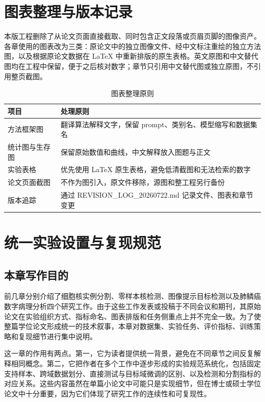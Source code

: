 \section{图表整理与版本记录}
本版工程删除了从论文页面直接截取、同时包含正文段落或页眉页脚的图像资产。各章使用的图表改为三类：原论文中的独立图像文件、经中文标注重绘的独立方法图，以及根据原论文数据在 LaTeX 中重新排版的原生表格。英文原图和中文替代图均在工程中保留，便于之后核对数字；章节只引用中文替代图或独立原图，不引用整页截图。

\begin{table}[htbp]
  \centering
  \caption{图表整理原则}
  \label{tab:appendix_revision_rules}
  \small
  \begin{tabular}{ll}
    \toprule
    项目 & 处理原则 \\
    \midrule
    方法框架图 & 翻译算法解释文字，保留 prompt、类别名、模型缩写和数据集名 \\
    统计图与生存图 & 保留原始数值和曲线，中文解释放入图题与正文 \\
    实验表格 & 优先使用 LaTeX 原生表格，避免低清截图和无法检索的数字 \\
    论文页面截图 & 不作为图引入，原文件移除，源图和整工程另行备份 \\
    版本追踪 & 通过 REVISION\_LOG\_20260722.md 记录文件、图表和章节变更 \\
    \bottomrule
  \end{tabular}
\end{table}

\section{统一实验设置与复现规范}

\subsection{本章写作目的}
前几章分别介绍了细胞核实例分割、零样本核检测、图像提示目标检测以及肺鳞癌数字病理分析四个研究工作。由于这些工作发表或投稿于不同会议和期刊，其原始论文在实验组织方式、指标命名、图表排版和任务侧重点上并不完全一致。为了使整篇学位论文形成统一的技术叙事，本章对数据集、实验任务、评价指标、训练策略和复现细节进行集中说明。

这一章的作用有两点。第一，它为读者提供统一背景，避免在不同章节之间反复解释相同概念。第二，它把作者在多个工作中逐步形成的实验规范系统化，包括固定支持样本、跨域数据划分、直接测试与目标域微调的区别、以及检测和分割指标的对应关系。这些内容虽然在单篇小论文中可能只是实现细节，但在博士或硕士学位论文中十分重要，因为它们体现了研究工作的连续性和可复现性。

